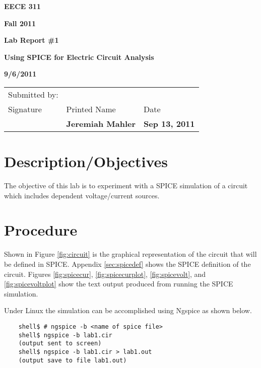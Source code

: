 \documentclass{article}
\begin{document}


\centerline{\bf EECE 311}
\centerline{\bf Fall 2011}
\centerline{\bf}
\centerline{\bf Lab Report \#1}
\centerline{\bf Using SPICE for Electric Circuit Analysis}
\centerline{\bf 9/6/2011}  %

\begin{center}
\begin{tabularx}{\textwidth}[b]{X l l}
Submitted by: & & \\
Signature & Printed Name & Date \\
\hline
\multicolumn{1}{|X|}{} & \multicolumn{1}{|l|}{\bigstrut \bf Jeremiah Mahler} & \multicolumn{1}{|l|}{\bf Sep 13, 2011} \\
\hline
\end{tabularx}
\end{center}

\section{Description/Objectives}

The objective of this lab is to experiment with a SPICE simulation
of a circuit which includes dependent voltage/current sources.


\section{Procedure}

Shown in Figure \ref{fig:circuit} is the graphical representation of the
 circuit that will be defined in SPICE.
Appendix \ref{sec:spicedef} shows the SPICE definition of the circuit.
Figures \ref{fig:spicecur}, \ref{fig:spicecurplot}, \ref{fig:spicevolt},
and \ref{fig:spicevoltplot} show the text output produced from running
the SPICE simulation.

Under Linux the simulation can be accomplished using Ngspice \cite{NGSPICE}
as shown below.
\begin{verbatim}
	shell$ # ngspice -b <name of spice file>
	shell$ ngspice -b lab1.cir
	(output sent to screen)
	shell$ ngspice -b lab1.cir > lab1.out
	(output save to file lab1.out)
\end{verbatim}
\end{document}
